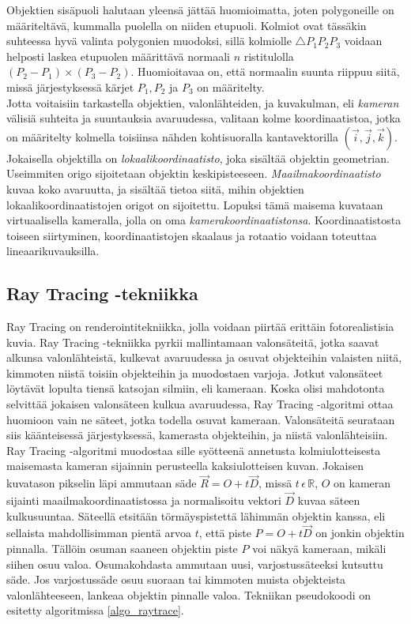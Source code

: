 \documentclass[a4paper,12pt, titlepage]{article}
\theoremstyle{break}
\newcommand{\R}{\mathbb{R}}
\begin{document}
Objektien sisäpuoli halutaan yleensä jättää huomioimatta, joten polygoneille on määriteltävä, kummalla puolella on niiden etupuoli. Kolmiot ovat tässäkin suhteessa hyvä valinta polygonien muodoksi, sillä kolmiolle $\triangle P_1P_2P_3$ voidaan helposti laskea etupuolen määrittävä normaali $n$ ristitulolla $(P_2-P_1) \times (P_3-P_2)$. Huomioitavaa on, että normaalin suunta riippuu siitä, missä järjestyksessä kärjet $P_1, P_2$ ja $P_3$ on määritelty.\cite{hughes}\\

Jotta voitaisiin tarkastella objektien, valonlähteiden, ja kuvakulman, eli \emph{kameran} välisiä suhteita ja suuntauksia avaruudessa, valitaan kolme koordinaatistoa, jotka on määritelty kolmella toisiinsa nähden kohtisuoralla kantavektorilla $(\vec{i},\vec{j},\vec{k})$. Jokaisella objektilla on \emph{lokaalikoordinaatisto}, joka sisältää objektin geometrian. Useimmiten origo sijoitetaan objektin keskipisteeseen. \emph{Maailmakoordinaatisto} kuvaa koko avaruutta, ja sisältää tietoa siitä, mihin objektien lokaalikoordinaatistojen origot on sijoitettu. Lopuksi tämä maisema kuvataan virtuaalisella kameralla, jolla on oma \emph{kamerakoordinaatistonsa}. Koordinaatistosta toiseen siirtyminen, koordinaatistojen skaalaus ja rotaatio voidaan toteuttaa lineaarikuvauksilla.\cite{janke}

\subsection{Ray Tracing -tekniikka}

Ray Tracing on renderointitekniikka, jolla voidaan piirtää erittäin fotorealistisia kuvia. Ray Tracing -tekniikka pyrkii mallintamaan valonsäteitä, jotka saavat alkunsa valonlähteistä, kulkevat avaruudessa ja osuvat objekteihin valaisten niitä, kimmoten niistä toisiin objekteihin ja muodostaen varjoja. Jotkut valonsäteet löytävät lopulta tiensä katsojan silmiin, eli kameraan. Koska olisi mahdotonta selvittää jokaisen valonsäteen kulkua avaruudessa, Ray Tracing -algoritmi ottaa huomioon vain ne säteet, jotka todella osuvat kameraan. Valonsäteitä seurataan siis käänteisessä järjestyksessä, kamerasta objekteihin, ja niistä valonlähteisiin.\cite{janke}\\

Ray Tracing -algoritmi muodostaa sille syötteenä annetusta kolmiulotteisesta maisemasta kameran sijainnin perusteella kaksiulotteisen kuvan. Jokaisen kuvatason pikselin läpi ammutaan säde $\vec{R}=O+t\vec{D}$, missä $t\,\epsilon\,\R$, $O$ on kameran sijainti maailmakoordinaatistossa ja normalisoitu vektori $\vec{D}$ kuvaa säteen kulkusuuntaa. Säteellä etsitään törmäyspistettä lähimmän objektin kanssa, eli sellaista mahdollisimman pientä arvoa $t$, että piste $P=O+t\vec{D}$ on jonkin objektin pinnalla. Tällöin osuman saaneen objektin piste $P$ voi näkyä kameraan, mikäli siihen osuu valoa. Osumakohdasta ammutaan uusi, varjostussäteeksi kutsuttu säde. Jos varjostussäde osuu suoraan tai kimmoten muista objekteista valonlähteeseen, lankeaa objektin pinnalle valoa.\cite{janke} Tekniikan pseudokoodi on esitetty algoritmissa \ref{algo_raytrace}.\\
\end{document}
